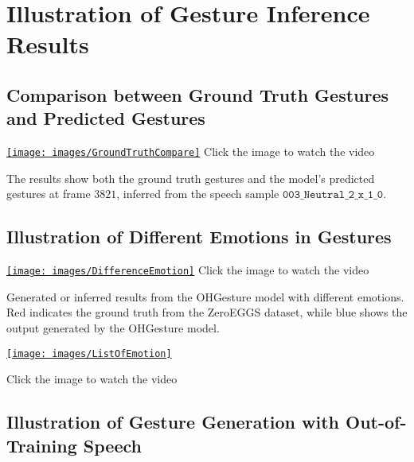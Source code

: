 \section{Illustration of Gesture Inference Results}
\label{Appendix3}

\subsection{Comparison between Ground Truth Gestures and Predicted Gestures}

\begin{center}
	\centering
	\href{https://youtu.be/22lNm2tvmrk}{%
		\texttt{[image: images/GroundTruthCompare]}}
	{\tiny Click the image to watch the video}
\end{center}

The results show both the ground truth gestures and the model's predicted gestures at frame $3821$, inferred from the speech sample $\texttt{003\_Neutral\_2\_x\_1\_0}$.

\subsection{Illustration of Different Emotions in Gestures}

{
	\begin{center}
		\centering
		\href{https://youtu.be/KUlBZXLtYJ4}{%
			\texttt{[image: images/DifferenceEmotion]}}
		{\tiny Click the image to watch the video}
	\end{center}
}

Generated or inferred results from the OHGesture model with different emotions. Red indicates the ground truth from the ZeroEGGS dataset, while blue shows the output generated by the OHGesture model.

{
	\begin{center}
		\centering
		\href{https://youtu.be/eZghfNGmZn8}{%
			\texttt{[image: images/ListOfEmotion]}}
		
		{\tiny Click the image to watch the video}
	\end{center}
}

\subsection{Illustration of Gesture Generation with Out-of-Training Speech}

